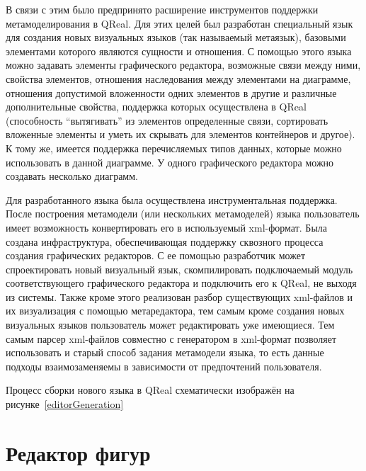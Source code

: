\documentclass[a4paper]{article}
\begin{document}
В связи с этим было предпринято расширение инструментов поддержки метамоделирования в QReal. Для этих целей был разработан специальный язык для создания новых визуальных языков (так называемый метаязык), базовыми элементами которого являются сущности и отношения. С помощью этого языка можно задавать элементы графического редактора, возможные связи между ними, свойства элементов, отношения наследования между элементами на диаграмме, отношения допустимой вложенности одних элементов в другие и различные дополнительные свойства, поддержка которых осуществлена в QReal (способность “вытягивать” из элементов определенные связи, сортировать вложенные элементы и уметь их скрывать для элементов контейнеров и другое). К тому же, имеется поддержка перечисляемых типов данных, которые можно использовать в данной диаграмме. У одного графического редактора можно создавать несколько диаграмм.

Для разработанного языка была осуществлена инструментальная поддержка. После построения метамодели (или нескольких метамоделей) языка пользователь имеет возможность конвертировать его в используемый xml-формат. Была создана инфраструктура, обеспечивающая поддержку сквозного процесса создания графических редакторов. С ее помощью разработчик может спроектировать новый визуальный язык, скомпилировать подключаемый модуль соответствующего графического редактора и подключить его к QReal, не выходя из системы. Также кроме этого реализован разбор существующих xml-файлов и их визуализация с помощью метаредактора, тем самым кроме создания новых визуальных языков пользователь может редактировать уже имеющиеся. Тем самым парсер xml-файлов совместно с генератором в xml-формат позволяет использовать и старый способ задания метамодели языка, то есть данные подходы взаимозаменяемы в зависимости от предпочтений пользователя.

Процесс сборки нового языка в QReal схематически изображён на рисунке~\ref{editorGeneration}

\section{Редактор фигур}
\end{document}
